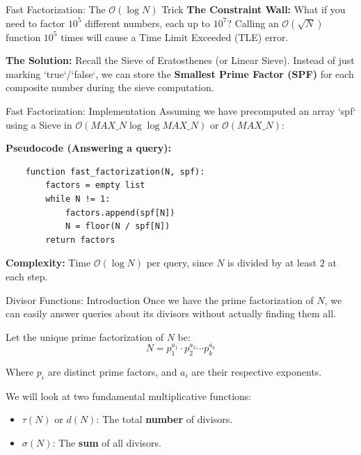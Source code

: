 \documentclass[aspectratio=169]{beamer}
\begin{document}
\begin{frame}{Fast Factorization: The $\mathcal{O}(\log N)$ Trick}
    \textbf{The Constraint Wall:} 
    What if you need to factor $10^5$ different numbers, each up to $10^7$? 
    Calling an $\mathcal{O}(\sqrt{N})$ function $10^5$ times will cause a Time Limit Exceeded (TLE) error.
    
    \vspace{0.3cm}
    \textbf{The Solution:} 
    Recall the Sieve of Eratosthenes (or Linear Sieve). Instead of just marking `true`/`false`, we can store the \textbf{Smallest Prime Factor (SPF)} for each composite number during the sieve computation.
    
    
\end{frame}

\begin{frame}[fragile]{Fast Factorization: Implementation}
    Assuming we have precomputed an array `spf` using a Sieve in $\mathcal{O}(MAX\_N \log \log MAX\_N)$ or $\mathcal{O}(MAX\_N)$:
    
    \vspace{0.3cm}
    \textbf{Pseudocode (Answering a query):}
    \begin{verbatim}
    function fast_factorization(N, spf):
        factors = empty list
        while N != 1:
            factors.append(spf[N])
            N = floor(N / spf[N])
        return factors
    \end{verbatim}
    
    \textbf{Complexity:} Time $\mathcal{O}(\log N)$ per query, since $N$ is divided by at least $2$ at each step.
\end{frame}

\begin{frame}{Divisor Functions: Introduction}
    Once we have the prime factorization of $N$, we can easily answer queries about its divisors without actually finding them all.
    
    \vspace{0.3cm}
    Let the unique prime factorization of $N$ be:
    $$N = p_1^{a_1} \cdot p_2^{a_2} \cdots p_k^{a_k}$$
    
    Where $p_i$ are distinct prime factors, and $a_i$ are their respective exponents.
    
    \vspace{0.3cm}
    We will look at two fundamental multiplicative functions:
    \begin{itemize}
        \item $\tau(N)$ or $d(N)$: The total \textbf{number} of divisors.
        \item $\sigma(N)$: The \textbf{sum} of all divisors.
    \end{itemize}
\end{frame}
\end{document}
